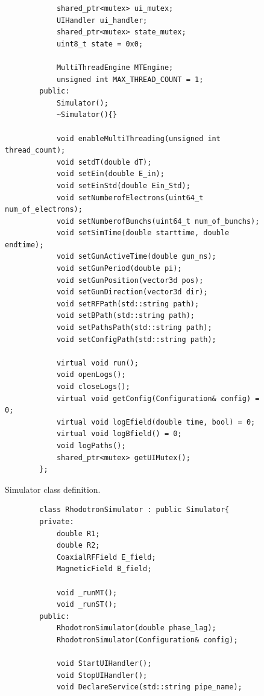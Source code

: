 \documentclass[a4paper,oneside,12pt]{report}
\numberwithin{equation}{chapter}
\begin{document}
{\begin{figure}[H]
\begin{verbatim}
            shared_ptr<mutex> ui_mutex;
            UIHandler ui_handler;
            shared_ptr<mutex> state_mutex;
            uint8_t state = 0x0;

            MultiThreadEngine MTEngine;
            unsigned int MAX_THREAD_COUNT = 1;
        public:
            Simulator();
            ~Simulator(){}

            void enableMultiThreading(unsigned int thread_count);
            void setdT(double dT);
            void setEin(double E_in);
            void setEinStd(double Ein_Std);
            void setNumberofElectrons(uint64_t num_of_electrons);
            void setNumberofBunchs(uint64_t num_of_bunchs);
            void setSimTime(double starttime, double endtime);
            void setGunActiveTime(double gun_ns);
            void setGunPeriod(double pi);
            void setGunPosition(vector3d pos);
            void setGunDirection(vector3d dir);
            void setRFPath(std::string path);
            void setBPath(std::string path);
            void setPathsPath(std::string path);
            void setConfigPath(std::string path);

            virtual void run();
            void openLogs();
            void closeLogs();
            virtual void getConfig(Configuration& config) = 0;
            virtual void logEfield(double time, bool) = 0;
            virtual void logBfield() = 0;
            void logPaths();
            shared_ptr<mutex> getUIMutex();
        };
    \end{verbatim}

    \vspace{5pt}
    \caption{Simulator class definition.}
    \label{fig:sim_class}
\end{figure}

\begin{figure}[H]
    \centering
    \begin{verbatim}
        class RhodotronSimulator : public Simulator{
        private:
            double R1;
            double R2;
            CoaxialRFField E_field;
            MagneticField B_field;

            void _runMT();
            void _runST();
        public:
            RhodotronSimulator(double phase_lag);
            RhodotronSimulator(Configuration& config);

            void StartUIHandler();
            void StopUIHandler();
            void DeclareService(std::string pipe_name);


\end{verbatim}
\end{figure}}
\end{document}

